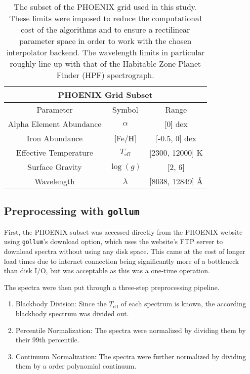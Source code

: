 \documentclass[twocolumn]{aastex631}
\begin{document}
\begin{table}[h]
    \hspace*{-1.1cm}\begin{tabular}{|c|c|c|}
        \hline
        \multicolumn{3}{|c|}{\textbf{PHOENIX Grid Subset}}\\
        \hline\hline
        Parameter & Symbol & Range\\
        \hline
        Alpha Element Abundance & $\alpha$ & [0] dex\\
        Iron Abundance & [Fe/H] & [-0.5, 0] dex\\
        Effective Temperature & $T_{\mathrm{eff}}$ & [2300, 12000] K\\
        Surface Gravity & $\log(g)$ & [2, 6]\\
        Wavelength & $\lambda$ & [8038, 12849] \AA\\
        \hline
    \end{tabular}
    \caption{The subset of the PHOENIX grid used in this study. These limits 
    were imposed to reduce the computational cost of the algorithms and to 
    ensure a rectilinear parameter space in order to work with the chosen
    interpolator backend. The wavelength limits in particular roughly line 
    up with that of the Habitable Zone Planet Finder (HPF) spectrograph.}
\end{table}

\subsection{Preprocessing with \texttt{gollum}}
First, the PHOENIX subset was accessed directly from the PHOENIX website
using \texttt{gollum}'s download option, which uses the website's FTP server
to download spectra without using any disk space. This came at the cost of
longer load times due to internet connection being significantly more of a
bottleneck than disk I/O, but was acceptable as this was a one-time operation.

The spectra were then put through a three-step preprocessing pipeline.
\begin{enumerate}
    \item Blackbody Division: Since the $T_{\mathrm{eff}}$ of each spectrum 
    is known, the according blackbody spectrum was divided out.
    \item Percentile Normalization: The spectra were normalized by dividing
    them by their 99th percentile.
    \item Continuum Normalization: The spectra were further normalized by 
    dividing them by a  order polynomial continuum.
\end{enumerate}
\end{document}
